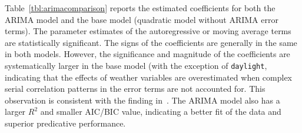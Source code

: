 \documentclass [11pt, proquest] {uwthesis}[2015/03/03]
\begin{document}
Table~\ref{tbl:arimacomparison} reports the estimated coefficients for both the ARIMA model and the base model (quadratic model without ARIMA error terms). The parameter estimates of the autoregressive or moving average terms are statistically significant. The signs of the coefficients are generally in the same in both models. However, the significance and magnitude of the coefficients are systematically larger in the base model (with the exception of \texttt{daylight}, indicating that the effects of weather variables are overestimated when complex serial correlation patterns in the error terms are not accounted for. This observation is consistent with the finding in~\cite{Gallop:2012aa}. The ARIMA model also has a larger $R^2$ and smaller AIC/BIC value, indicating a better fit of the data and superior predicative performance. 
\end{document}
